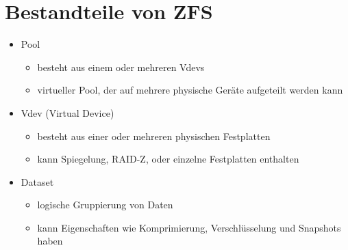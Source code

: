     \section{Bestandteile von ZFS}\label{sec:bestandteile-von-zfs}
    \begin{frame}
        \slidehead
        \begin{itemize}[<+->]

        \item Pool
        \begin{itemize}
            \item besteht aus einem oder mehreren Vdevs
            \item virtueller Pool, der auf mehrere physische Geräte aufgeteilt werden kann
        \end{itemize}

        \item Vdev (Virtual Device)
        \begin{itemize}
            \item besteht aus einer oder mehreren physischen Festplatten
            \item kann Spiegelung, RAID-Z, oder einzelne Festplatten enthalten
        \end{itemize}

        \item Dataset
        \begin{itemize}
            \item logische Gruppierung von Daten
            \item kann Eigenschaften wie Komprimierung, Verschlüsselung und Snapshots haben
        \end{itemize}

        \end{itemize}
    \end{frame}

